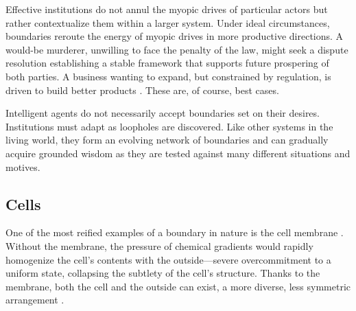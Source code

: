 \documentclass[11pt]{article}
\begin{document}
Effective institutions do not annul the myopic drives of particular actors but rather contextualize them within a larger system. Under ideal circumstances, boundaries reroute the energy of myopic drives in more productive directions. A would-be murderer, unwilling to face the penalty of the law, might seek a dispute resolution establishing a stable framework that supports future prospering of both parties. A business wanting to expand, but constrained by regulation, is driven to build better products \citep{wu2011master, ashford1985using, ambec2013porter}. These are, of course, best cases.

Intelligent agents do not necessarily accept boundaries set on their desires. Institutions must adapt as loopholes are discovered. Like other systems in the living world, they form an evolving network of boundaries \citep{campbell1979assessing, ordonez2009goals, kerr1975folly, burns2006impact} and can gradually acquire grounded wisdom as they are tested against many different situations and motives.


\subsection{Cells}




One of the most reified examples of a boundary in nature is the cell membrane \citep{watson2015biological, alberts2022molecular, bray2019wetware, harold2001way, lane2015vital}. Without the membrane, the pressure of chemical gradients would rapidly homogenize the cell's contents with the outside---severe overcommitment to a uniform state, collapsing the subtlety of the cell's structure. Thanks to the membrane, both the cell and the outside can exist, a more diverse, less symmetric arrangement \citep{schrodinger1944what, anderson1972more, prigogine1984order, turing1952chemical}. 
\end{document}
